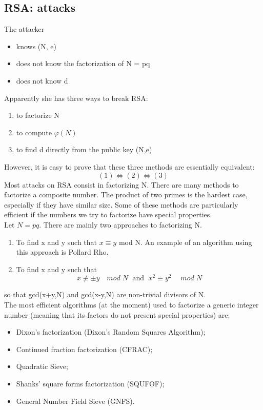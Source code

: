 \documentclass[a4paper, 10pt, titlepage]{article}
\begin{document}
\subsection{RSA: attacks}
The attacker 
\begin{itemize}
\item knows (N, e)
\item does not know the factorization of N = pq
\item does not know d
\end{itemize}
Apparently she has three ways to break RSA:
\begin{enumerate}
\item to factorize N
\item to compute $\varphi(N)$
\item to find d directly from the public key (N,e)
\end{enumerate}
However, it is easy to prove that these three methods are essentially
equivalent:
$$(1) \Leftrightarrow (2) \Leftrightarrow (3)$$
Most attacks on RSA consist in factorizing N.
There are many methods to factorize a composite number. The product of two primes is the hardest case, especially if they have similar size. Some of these methods are particularly efficient if the numbers we try to factorize have special properties. \\
Let $N = pq$. There are mainly two approaches to factorizing N.
\begin{enumerate}
\item To find x and y such that $x \equiv y$ mod N. An example of an
algorithm using this approach is Pollard Rho.
\item To find x and y such that
$$x \not\equiv \pm y \quad mod \; N \; \text{ and } \; x^2 \equiv y^2 \; \quad mod \; N $$
\end{enumerate}
so that gcd(x+y,N) and gcd(x-y,N) are non-trivial divisors of N. \\
The most efficient algorithms (at the moment) used to factorize a generic integer number (meaning that its factors do not present special properties) are:
\begin{itemize}
\item Dixon’s factorization (Dixon’s Random Squares Algorithm);
\item Continued fraction factorization (CFRAC);
\item Quadratic Sieve;
\item Shanks’ square forms factorization (SQUFOF);
\item General Number Field Sieve (GNFS).
\end{itemize}
\end{document}
